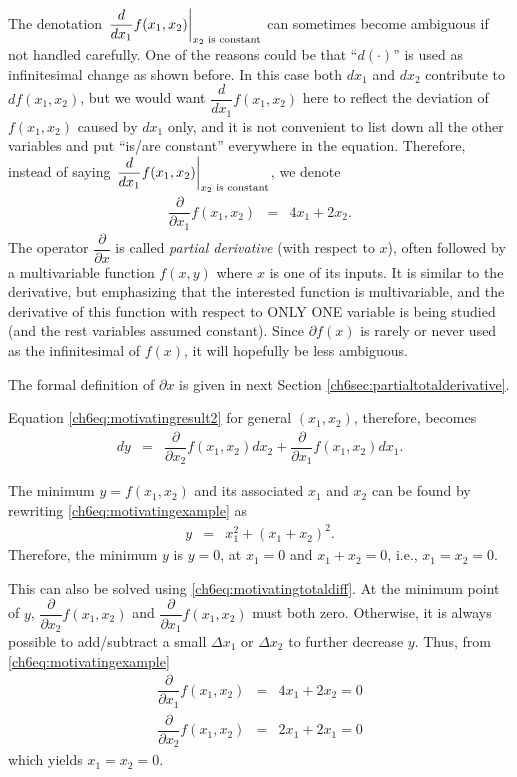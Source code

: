 The denotation $\left.\dfrac{d}{dx_1}f(x_1,x_2)\right|_{x_2 \textup{~is constant}}$ can sometimes become ambiguous if not handled carefully. One of the reasons could be that ``$d(\cdot)$'' is used as infinitesimal change as shown before. In this case both $dx_1$ and $dx_2$ contribute to $df(x_1,x_2)$, but we would want $\dfrac{d}{dx_1}f(x_1,x_2)$ here to reflect the deviation of $f(x_1,x_2)$ caused by $dx_1$ only, and it is not convenient to list down all the other variables and put ``is/are constant'' everywhere in the equation. Therefore, instead of saying $\left.\dfrac{d}{dx_1}f(x_1,x_2)\right|_{x_2 \textup{~is constant}}$, we denote 
\begin{eqnarray}
	\dfrac{\partial}{\partial x_1} f(x_1, x_2) &=& 4x_1 + 2x_2. \nonumber
\end{eqnarray}
The operator $\dfrac{\partial}{\partial x}$ is called \textit{partial derivative} (with respect to $x$), often followed by a multivariable function $f(x,y)$ where $x$ is one of its inputs. It is similar to the derivative, but emphasizing that the interested function is multivariable, and the derivative of this function with respect to ONLY ONE variable is being studied (and the rest variables assumed constant). Since $\partial f(x)$ is rarely or never used as the infinitesimal of $f(x)$, it will hopefully be less ambiguous.

The formal definition of $\partial x$ is given in next Section \ref{ch6sec:partialtotalderivative}.

Equation \eqref{ch6eq:motivatingresult2} for general $(x_1,x_2)$, therefore, becomes
\begin{eqnarray}
	d y &=& \dfrac{\partial}{\partial x_2}f(x_1,x_2) d x_2 + \dfrac{\partial}{\partial x_1}f(x_1,x_2) d x_1. \label{ch6eq:motivatingtotaldiff}
\end{eqnarray}

The minimum $y=f(x_1,x_2)$ and its associated $x_1$ and $x_2$ can be found by rewriting \eqref{ch6eq:motivatingexample} as
\begin{eqnarray}
	y &=& x_1^2 + \left(x_1 + x_2\right)^2. \nonumber
\end{eqnarray}
Therefore, the minimum $y$ is $y=0$, at $x_1 = 0$ and $x_1 + x_2 = 0$, i.e., $x_1 = x_2 = 0$.

This can also be solved using \eqref{ch6eq:motivatingtotaldiff}. At the minimum point of $y$, $\dfrac{\partial}{\partial x_2}f(x_1,x_2)$ and $\dfrac{\partial}{\partial x_1}f(x_1,x_2)$ must both zero. Otherwise, it is always possible to add/subtract a small $\Delta x_1$ or $\Delta x_2$ to further decrease $y$. Thus, from \eqref{ch6eq:motivatingexample}
\begin{eqnarray}
	\dfrac{\partial}{\partial x_1}f(x_1,x_2) &=& 4x_1 + 2x_2 = 0 \nonumber \\
	\dfrac{\partial}{\partial x_2}f(x_1,x_2) &=& 2x_1 + 2x_1 = 0
\end{eqnarray}
which yields $x_1=x_2=0$.

